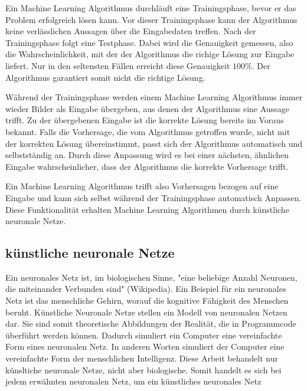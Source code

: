 Ein Machine Learning Algorithmus durchläuft eine Trainingsphase, bevor er das
Problem erfolgreich lösen kann. Vor dieser Trainingsphase kann der Algorithmus
keine verlässlichen Aussagen über die Eingabedaten treffen. Nach der
Trainingsphase folgt eine Testphase. Dabei wird die Genauigkeit gemessen, also
die Wahrscheinlichkeit, mit der der Algorithmus die richige Lösung zur Eingabe
liefert. Nur in den seltensten Fällen erreicht diese Genauigkeit $100\%$. Der
Algorithmus garantiert somit nicht die richtige Lösung.

Während der Trainingsphase werden einem Machine Learning Algorithmus immer
wieder Bilder als Eingabe übergeben, aus denen der Algorithmus eine Aussage
trifft. Zu der übergebenen Eingabe ist die korrekte Lösung bereits
im Voraus bekannt. Falls die Vorhersage, die vom Algorithmus getroffen wurde,
nicht mit der korrekten Lösung übereinstimmt, passt sich der Algorithmus
automatisch und selbstständig an. Durch diese Anpassung wird es bei einer %
nächsten, ähnlichen Eingabe wahrscheinlicher, dass der Algorithmus die korrekte
Vorhersage trifft. 

Ein Machine Learning Algorithmus trifft also Vorhersagen bezogen auf eine
Eingabe und kann sich selbst während der Trainingsphase automatisch Anpassen.
Diese Funktionalität erhalten Machine Learning Algorithmen durch künstliche
neuronale Netze.


\subsection*{künstliche neuronale Netze}

Ein neuronales Netz ist, im biologischen Sinne, "eine beliebige Anzahl Neuronen,
die miteinander Verbunden sind" (Wikipedia). Ein Beispiel für ein neuronales
Netz ist das menschliche Gehirn, worauf die kognitive Fähigkeit des Menschen
beruht. Künstliche Neuronale Netze stellen ein Modell von neuronalen Netzen dar.
Sie sind somit theoretische Abbildungen der Realität, die in Programmcode
überführt werden können. Dadurch simuliert ein Computer eine vereinfachte Form
eines neuronalen Netz. In anderen Worten simuliert der Computer eine
vereinfachte Form der menschlichen Intelligenz. Diese Arbeit behandelt nur
künsltiche neuronale Netze, nicht aber biologische. Somit handelt es sich bei
jedem erwähnten neuronalen Netz, um ein künstliches neuronales Netz 

